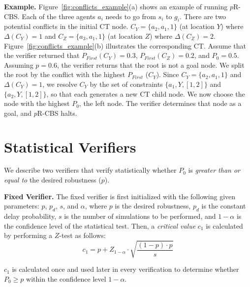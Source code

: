 \documentclass{article}
\newcommand{\prcbs}{$p$R-CBS\xspace}
\begin{document}
{\bf Example.} Figure~\ref{fig:conflicts_example}(a) shows an example of running \prcbs{}. Each of the three agents $a_i$ needs to go from $s_i$ to $g_i$. 
There are two potential conflicts in the initial CT node. $C_Y=\{a_2,a_1, 1\}$ (at location $Y$) where $\Delta(C_Y)=1$ and $C_Z=\{a_3,a_1, 1\}$ (at location $Z$) where $\Delta(C_Z)=2$.
Figure~\ref{fig:conflicts_example}(b) illustrates the corresponding CT. Assume that the verifier returned that $P_{First}(C_Y)=0.3$, $P_{First}(C_Z)=0.2$, and $P_0=0.5$. Assuming $p=0.6$, the verifier returns that the root is not a goal node. We split the root by the conflict with the highest $P_{First}$ ($C_Y$). Since $C_Y=\{a_2,a_1, 1\}$ and $\Delta(C_Y)=1$, we resolve $C_Y$ by the set of constraints $\{a_1,Y,[1,2]\}$ and $\{a_2,Y,[1,2]\}$, so that each generates a new CT child node.  We now choose the node with the highest $P_0$, the left node. The verifier determines that node as a goal, and \prcbs{} halts. 


\section{Statistical Verifiers}
\label{sec:stat-verifier}
We describe two verifiers that verify statistically whether $P_0$ is {\em greater than or equal to} the desired robustness ($p$). %


{\bf Fixed Verifier.} The fixed verifier is first initialized with the following given parameters: $p$, $p_d$, $s$, and $\alpha$, where $p$ is the desired robustness, $p_d$ is the constant delay probability, $s$ is the number of simulations to be performed, and $1-\alpha$ is the confidence level of the statistical test. Then, a {\em critical value} $c_1$ is calculated by performing a $Z$-test as follows:
\begin{equation}
{  c_1=p+Z_{1-\alpha} \cdot \sqrt{\frac{(1-p) \cdot p}{s}}}
\label{equ:critical}
\end{equation}

$c_1$ is calculated once and used later in every verification to determine whether $P_0 \geq p$ within the confidence level $1-\alpha$.
\end{document}
